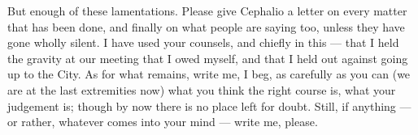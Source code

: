 But enough of these lamentations. Please give Cephalio a letter on every matter that has been done, and finally on what people are saying too, unless they have gone wholly silent. I have used your counsels, and chiefly in this --- that I held the gravity at our meeting that I owed myself, and that I held out against going up to the City. As for what remains, write me, I beg, as carefully as you can (we are at the last extremities now) what you think the right course is, what your judgement is; though by now there is no place left for doubt. Still, if anything --- or rather, whatever comes into your mind --- write me, please.
